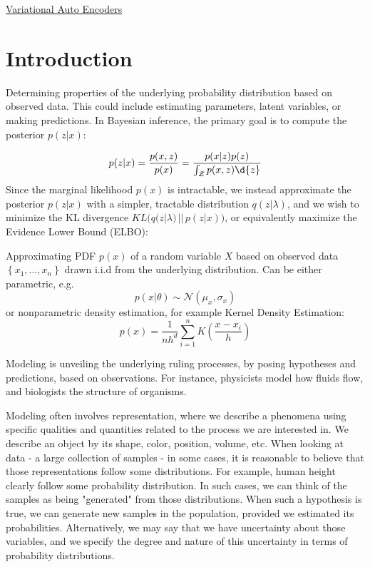 \documentclass{article}
\begin{document}
\begin{center}
{\huge \underline{Variational Auto Encoders}}
\end{center}
\section{Introduction}
\begin{definition} Determining properties of the underlying probability distribution based on observed data. This could include estimating parameters, latent variables, or making predictions. In Bayesian inference, the primary goal is to compute the posterior $p(z|x)$:

\[
  p(z|x) = \frac{p(x,z)}{p(x)} = \frac{p(x|z) p(z)}{\int_{\mathcal{Z}} p(x,z) \d{z} }
\]
Since the marginal likelihood $p(x)$ is intractable, we instead approximate the posterior $p(z|x)$ with a simpler, tractable distribution $q(z| \lambda)$, and we wish to minimize the KL divergence $KL \Big( q(z | \lambda) \, || \, p(z | x) \Big)$, or equivalently maximize the Evidence Lower Bound (ELBO):


\end{definition}
\begin{definition} Approximating PDF $p(x)$ of a random variable $X$ based on observed data $\left\{ x_1, \ldots, x_n \right\}$ drawn i.i.d from the underlying distribution. Can be either parametric, e.g.
\[
  p(x | \theta) \sim  \mathcal{N}( \mu_x, \sigma_x)
\]
or nonparametric density estimation, for example Kernel Density Estimation:
\[
  p(x) = \frac{1}{n h^{d}} \sum_{i=1}^{n} K \left( \frac{x-x_i}{h} \right) 
\]
\end{definition}
\begin{definition}[Modeling] Modeling is unveiling the underlying ruling processes, by posing hypotheses and predictions, based on observations. For instance, physicists model how fluids flow, and biologists the  structure of organisms. 

Modeling often involves representation, where we describe a phenomena using specific qualities and quantities related to the process we are interested in. We describe an object by its shape, color, position, volume, etc. 
When looking at data - a large collection of samples - in some cases, it is reasonable to believe that those representations follow some distributions. For example, human height clearly follow some probability distribution. In such cases, we can think of the samples as being "generated" from those distributions. When such a hypothesis is true, we can generate new samples in the population, provided we estimated its probabilities. Alternatively, we may say that we have uncertainty about those variables, and we specify the degree and nature of this uncertainty  in terms of probability distributions.  
\end{definition}
\end{document}
